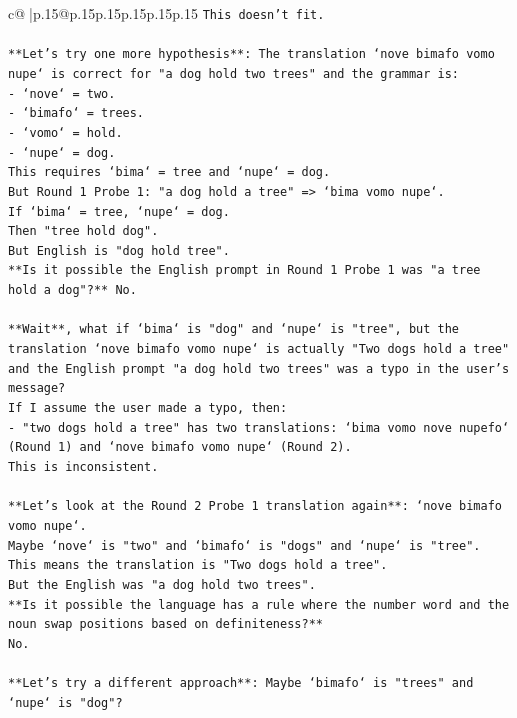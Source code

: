 \documentclass{article}
\begin{document}
{\begin{supertabular}{c@{$\;$}|p{.15\linewidth}@{}p{.15\linewidth}p{.15\linewidth}p{.15\linewidth}p{.15\linewidth}p{.15\linewidth}}
{{{\texttt{This doesn't fit.} \\
\\ 
\texttt{**Let's try one more hypothesis**: The translation `nove bimafo vomo nupe` is correct for "a dog hold two trees" and the grammar is:} \\
\texttt{{-} `nove` = two.} \\
\texttt{{-} `bimafo` = trees.} \\
\texttt{{-} `vomo` = hold.} \\
\texttt{{-} `nupe` = dog.} \\
\texttt{This requires `bima` = tree and `nupe` = dog.} \\
\texttt{But Round 1 Probe 1: "a dog hold a tree" => `bima vomo nupe`.} \\
\texttt{If `bima` = tree, `nupe` = dog.} \\
\texttt{Then "tree hold dog".} \\
\texttt{But English is "dog hold tree".} \\
\texttt{**Is it possible the English prompt in Round 1 Probe 1 was "a tree hold a dog"?** No.} \\
\\ 
\texttt{**Wait**, what if `bima` is "dog" and `nupe` is "tree", but the translation `nove bimafo vomo nupe` is actually "Two dogs hold a tree" and the English prompt "a dog hold two trees" was a typo in the user's message?} \\
\texttt{If I assume the user made a typo, then:} \\
\texttt{{-} "two dogs hold a tree" has two translations: `bima vomo nove nupefo` (Round 1) and `nove bimafo vomo nupe` (Round 2).} \\
\texttt{This is inconsistent.} \\
\\ 
\texttt{**Let's look at the Round 2 Probe 1 translation again**: `nove bimafo vomo nupe`.} \\
\texttt{Maybe `nove` is "two" and `bimafo` is "dogs" and `nupe` is "tree".} \\
\texttt{This means the translation is "Two dogs hold a tree".} \\
\texttt{But the English was "a dog hold two trees".} \\
\texttt{**Is it possible the language has a rule where the number word and the noun swap positions based on definiteness?**} \\
\texttt{No.} \\
\\ 
\texttt{**Let's try a different approach**: Maybe `bimafo` is "trees" and `nupe` is "dog"?} \\
}}}
\end{supertabular}}
\end{document}
